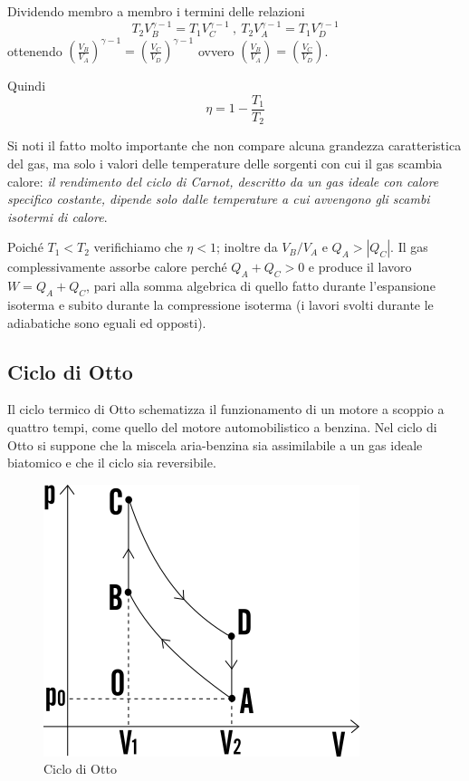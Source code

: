 \documentclass[class=book, crop=false, oneside, 12pt]{standalone}
\begin{document}
Dividendo membro a membro i termini delle relazioni
\begin{equation*}
    T_2 V_B^{\gamma - 1} = T_1 V_C^{\gamma - 1} \ , \ T_2 V_A^{\gamma - 1} = T_1 V_D^{\gamma - 1} 
\end{equation*}
ottenendo \(\left(\frac{V_B}{V_A}\right)^{\gamma - 1} = \left(\frac{V_C}{V_D}\right)^{\gamma - 1}\) ovvero \(\left(\frac{V_B}{V_A}\right) = \left(\frac{V_C}{V_D}\right)\).

Quindi
\begin{equation}
    \eta = 1 - \frac{T_1}{T_2}
\end{equation}

Si noti il fatto molto importante che non compare alcuna grandezza caratteristica del gas, ma solo i valori delle temperature delle sorgenti con cui il gas scambia calore: 
\emph{il rendimento del ciclo di Carnot, descritto da un gas ideale con calore specifico costante, dipende solo dalle temperature a cui avvengono gli scambi isotermi di calore}.

Poiché \(T_1 < T_2\) verifichiamo che \(\eta<1\); inoltre da \(V_B / V_A\) e \(Q_A > | Q_C | \). 
Il gas complessivamente assorbe calore perché \(Q_A + Q_C > 0\) e produce il lavoro \(W = Q_A + Q_C\), pari alla somma algebrica di quello fatto durante l'espansione isoterma e subito durante la compressione isoterma (i lavori svolti durante le adiabatiche sono eguali ed opposti). 

\subsection{Ciclo di Otto}

Il ciclo termico di Otto schematizza il funzionamento di un motore a scoppio a quattro tempi, come quello del motore automobilistico a benzina. 
Nel ciclo di Otto si suppone che la miscela aria-benzina sia assimilabile a un gas ideale biatomico e che il ciclo sia reversibile. 

\begin{figure}[h]
    \includegraphics[scale=0.4]{ciclo-otto}
    \centering
    \caption{Ciclo di Otto}
\end{figure}
\end{document}
